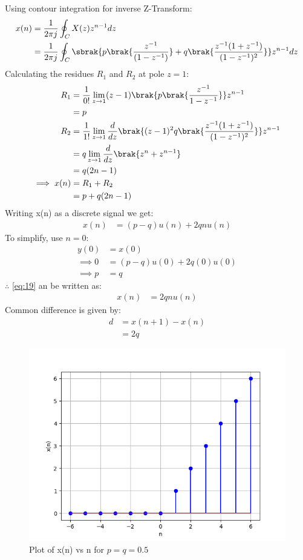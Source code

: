 \documentclass[journal,12pt,twocolumn]{IEEEtran}
\theoremstyle{remark}
\begin{document}
Using contour integration for inverse Z-Transform:
\begin{align}
    x(n) &= \frac{1}{2\pi j} \oint_C X(z) z^{n-1}dz\\
    &= \frac{1}{2 \pi j} \oint_C  \sbrak{p\brak{\frac{z^{-1}}{(1-z^{-1})}} + q\brak{\frac{z^{-1}(1 + z^{-1})}{(1-z^{-1})^2}}}z^{n-1}dz
\end{align}
Calculating the residues $R_1$ and $R_2$ at pole $z=1$:
\begin{align}
    R_1 &= \frac{1}{0!} \lim_{z \to 1}(z-1)\brak{p\brak{\frac{z^{-1}}{1-z^{-1}}}}z^{n-1}\\
    &= p\\
    R_2 &= \frac{1}{1!} \lim_{z \to 1}\frac{d}{dz}\brak{(z-1)^2q\brak{\frac{z^{-1}(1 + z^{-1})}{(1-z^{-1})^2}}}z^{n-1}\\
    &= q\lim_{z \to 1}\frac{d}{dz}\brak{z^{n} + z^{n-1}}\\
    &= q(2n-1)\\
    \implies x(n) &= R_1 + R_2\\
    &= p + q(2n-1)
\end{align}
Writing x(n) as a discrete signal we get:
\begin{align}
    x(n) &= (p-q)u(n) + 2qnu(n)\label{eq:19}
\end{align}
To simplify, use $n=0$:
\begin{align}
    y(0)&=x(0)\\
    \implies 0 &= (p-q)u(0) +2q(0)u(0)\\
    \implies p &= q
\end{align}
$\therefore$ \eqref{eq:19} an be written as:
\begin{align}
    x(n) &= 2qnu(n)
\end{align}
Common difference is given by:
\begin{align}
    d &= x(n+1) - x(n)\\
    &= 2q
\end{align}
\begin{figure}[!h]
    \centering
    \includegraphics[width = \columnwidth]{ncert-maths/11/9/2/8/figs/x_plot.png}
    \caption{Plot of x(n) vs n for $p=q=0.5$}
    \label{fig:1}
\end{figure}
\end{document}
